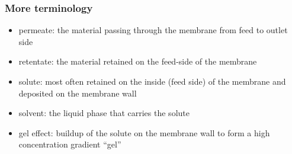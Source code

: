 \begin{frame}\frametitle{More terminology}
	\begin{itemize}
		\item	{\color{purple}permeate}: the material passing through the membrane from feed to outlet side
		\item	{\color{purple}retentate}: the material retained on the feed-side of the membrane
		\item	{\color{purple}solute}: most often retained on the inside (feed side) of the membrane and deposited on the membrane wall
		\item	{\color{purple}solvent}: the liquid phase that carries the solute
		\item	{\color{purple}gel effect}: buildup of the solute on the membrane wall to form a high concentration gradient ``gel''
		
	\end{itemize}
	
\end{frame}

